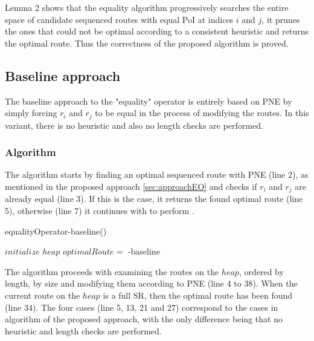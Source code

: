 Lemma 2 shows that the equality algorithm progressively searches the entire space of candidate sequenced routes with equal PoI at indices $i$ and $j$, it prunes the ones that could not be optimal according to a consistent heuristic and returns the optimal route. Thus the correctness of the proposed algorithm is proved.

\subsection{Baseline approach} 
\label{sec:baselineEO}
\enlargethispage{\baselineskip}
The baseline approach to the "equality" operator is entirely based on PNE by simply forcing $r_i$ and $r_j$ to be equal in the process of modifying the routes. In this variant, there is no heuristic and also no length checks are performed.

\subsubsection{Algorithm}
The algorithm \texttt{} starts by finding an optimal sequenced route with PNE (line 2), as mentioned in the proposed approach \ref{sec:approachEO} and checks if $r_i$ and $r_j$ are already equal (line 3). If this is the case, it returns the found optimal route (line 5), otherwise (line 7) it continues with to perform \texttt{}. 

\begin{algorithm}[htb!]
\caption{equalityOperator-baseline()}
\label{alg:equality_baseline}
	
	
	
	\BlankLine
	
	$initialize$ $heap$ 
	$optimalRoute =$\;
	{
		\modifiedPNE-baseline{}\;
	}
\end{algorithm}

The algorithm \texttt{} proceeds with examining the routes on the $heap$, ordered by length, by size and modifying them according to PNE (line 4 to 38). When the current route on the $heap$ is a full SR, then the optimal route has been found (line 34). The four cases (line 5, 13, 21 and 27) correspond to the cases in algorithm of the proposed approach, with the only difference being that no heuristic and length checks are performed. \newline

